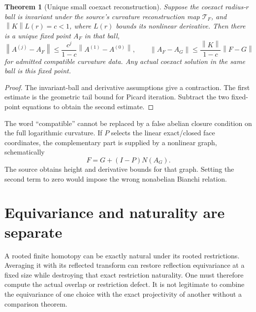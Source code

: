 \documentclass[11pt,a4paper,oneside]{book}
\theoremstyle{plain}
\newtheorem{theorem}{Theorem}[chapter]
\theoremstyle{definition}
\theoremstyle{remark}
\newcommand{\norm}[1]{\left\lVert#1\right\rVert}
\newcommand{\src}[2]{\cite{#1}}
\begin{document}
\begin{theorem}[Unique small coexact reconstruction]
\label{thm:coexact}
Suppose the coexact radius-$r$ ball is invariant under the source's curvature reconstruction map $\mathcal T_F$, and $\norm K L(r)=c<1$, where $L(r)$ bounds its nonlinear derivative. Then there is a unique fixed point $A_F$ in that ball,
\begin{equation}
 \norm{A^{(j)}-A_F}\le\frac{c^j}{1-c}\norm{A^{(1)}-A^{(0)}},
 \qquad
 \norm{A_F-A_G}\le\frac{\norm K}{1-c}\norm{F-G}
 \label{eq:coexact-stability}
\end{equation}
for admitted compatible curvature data. Any actual coexact solution in the same ball is this fixed point.
\end{theorem}
\begin{proof}
The invariant-ball and derivative assumptions give a contraction. The first estimate is the geometric tail bound for Picard iteration. Subtract the two fixed-point equations to obtain the second estimate.
\end{proof}
\src{R18}{thm:v18v78-unique-reconstruction}

The word ``compatible'' cannot be replaced by a false abelian closure condition on the full logarithmic curvature. If $P$ selects the linear exact/closed face coordinates, the complementary part is supplied by a nonlinear graph, schematically
\begin{equation}
 F=G+(I-P)N(A_G).
 \label{eq:curvature-graph}
\end{equation}
The source obtains height and derivative bounds for that graph. Setting the second term to zero would impose the wrong nonabelian Bianchi relation. \src{R18}{thm:v18v89-curvature-graph,thm:v18v91-graph-height,thm:v18v92-graph-differential}

\section{Equivariance and naturality are separate}
A rooted finite homotopy can be exactly natural under its rooted restrictions. Averaging it with its reflected transform can restore reflection equivariance at a fixed size while destroying that exact restriction naturality. One must therefore compute the actual overlap or restriction defect. It is not legitimate to combine the equivariance of one choice with the exact projectivity of another without a comparison theorem. \src{R18}{thm:v18v88-reflection-average}
\end{document}
